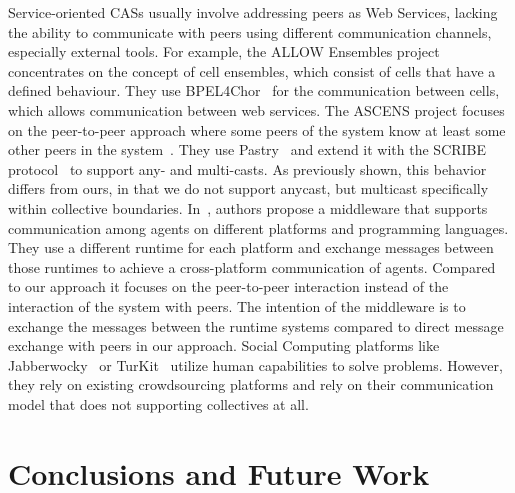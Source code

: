 \documentclass{llncs}
\begin{document}
  Service-oriented CASs usually involve addressing peers as Web Services, lacking the ability to communicate with peers using different communication channels, especially external tools. For example, the ALLOW Ensembles project~\cite{Andrikopoulos} concentrates on the concept of cell ensembles, which consist of cells that have a defined behaviour. They use BPEL4Chor~\cite{BPEL4Chor} for the communication between cells, which allows communication between web services. 
  The ASCENS project focuses on the peer-to-peer approach where some peers of the system know at least some other peers in the system~\cite{AutonomicCloud}. They use Pastry~\cite{Pastry} and extend it with the SCRIBE protocol~\cite{Scribe} to support any- and multi-casts. As previously shown, this behavior differs from ours, in that we do not support anycast, but multicast specifically within collective boundaries.
  In~\cite{Cabri1}, authors propose a middleware that supports communication among agents on different platforms and programming languages. They use a different runtime for each platform and exchange messages between those runtimes to achieve a cross-platform communication of agents. Compared to our approach it focuses on the peer-to-peer interaction instead of the interaction of the system with peers. The intention of the middleware is to exchange the messages between the runtime systems compared to direct message exchange with peers in our approach.
  Social Computing platforms like Jabberwocky~\cite{Jabberwocky} or TurKit~\cite{Turkit} utilize human capabilities to solve problems. However, they rely on existing crowdsourcing platforms and rely on their communication model that does not supporting collectives at all. 

\vspace{-5pt}

\section{Conclusions and Future Work}
\label{sec:conclusion}
\end{document}
